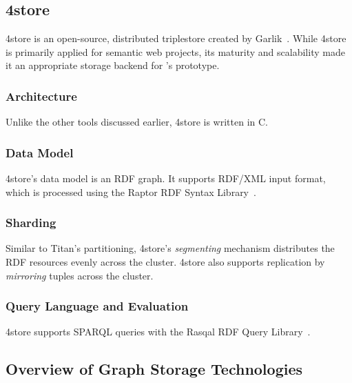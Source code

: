 
\subsection{4store}
\label{4store}

4store is an open-source, distributed triplestore created by Garlik~\cite{4store}. While 4store is primarily applied for semantic web projects, its maturity and scalability made it an appropriate storage backend for \iqd{}'s prototype.

\subsubsection{Architecture}

Unlike the other tools discussed earlier, 4store is written in C. 

\subsubsection{Data Model}

4store's data model is an RDF graph. It supports RDF/XML input format, which is processed using the Raptor RDF Syntax Library~\cite{Raptor}.

\subsubsection{Sharding}

Similar to Titan's partitioning, 4store's \emph{segmenting} mechanism distributes the RDF resources evenly across the cluster. 4store also supports replication by \emph{mirroring} tuples across the cluster.

\subsubsection{Query Language and Evaluation}

4store supports SPARQL queries with the Rasqal RDF Query Library~\cite{Rasqal}.  


\subsection{Overview of Graph Storage Technologies}

